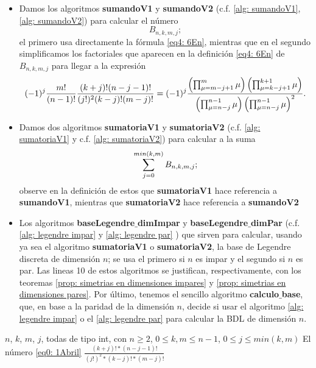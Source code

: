\begin{itemize}
\item Damos los algoritmos \textbf{sumandoV1} y 
\textbf{sumandoV2} (c.f. \ref{alg: sumandoV1},
\ref{alg: sumandoV2}) para calcular el número
\begin{equation}
\label{eq0: 1Abril}
B_{n, k, m, j};
\end{equation}
el primero usa directamente la fórmula \eqref{eq4: 6En},
mientras que en el segundo 
simplificamos los factoriales que
aparecen en la definición \eqref{eq4: 6En}
de $B_{n,k,m,j}$
para llegar a la expresión
\[
(-1)^{j}
\frac{m!}{(n-1)!}
 \frac{(k+j)!(n-j-1)!}{(j!)^{2}(k-j)!(m-j)!}
= (-1)^{j}
\frac{\left( \prod_{\mu=m-j+1}^{m}{\mu} \right)
\left( \prod_{\mu=k-j+1}^{k+1}{\mu} \right)
}{
\left( \prod_{\mu=n-j}^{n-1}{\mu} \right)
\left( \prod_{\mu=n-j}^{n-1}{\mu} \right)^{2}
}.
\]

\item Damos dos algoritmos \textbf{sumatoriaV1}
y \textbf{sumatoriaV2} (c.f. \ref{alg: sumatoriaV1}
y c.f. \ref{alg: sumatoriaV2}) para calcular a la suma
\begin{equation}
\label{eq1: 1Abril}
\sum\limits_{j=0}^{min(k,m)}B_{n, k, m, j};
\end{equation}
observe en la definición de estos que 
\textbf{sumatoriaV1} hace referencia a
\textbf{sumandoV1}, mientras que \textbf{sumatoriaV2}
hace referencia a \textbf{sumandoV2}


\item Los algoritmos 
\textbf{baseLegendre$\_$dimImpar} y
\textbf{baseLegendre$\_$dimPar} 
(c.f. \ref{alg: legendre impar} y \ref{alg: legendre par} )
que sirven para calcular, usando ya sea el algoritmo
\textbf{sumatoriaV1} o \textbf{sumatoriaV2},
la base de Legendre discreta de dimensión $n$; se usa el primero
si $n$ es impar y el segundo si $n$ es par.
Las lineas 10 de estos 
algoritmos se justifican,
respectivamente, con los teoremas 
\ref{prop: simetrias en dimensiones impares}
y \ref{prop: simetrias en dimensiones pares}.
Por último, tenemos el sencillo algoritmo \textbf{calculo$\_$base},
que, en base a la paridad de la dimensión $n$, decide si usar
el algoritmo \ref{alg: legendre impar} o el \ref{alg: legendre par}
para calcular la BDL de dimensión $n$.
\end{itemize}


\begin{algorithm}
\caption{$sumandoV1$}\label{alg: sumandoV1}
\begin{algorithmic} [1]
\REQUIRE $n$, $k$, $m$, $j$, todas de tipo int, con $n \geq 2$, 
$0 \leq k, m \leq n-1$, $0 \leq j \leq min(k,m)$
\ENSURE El número \eqref{eq0: 1Abril}
\RETURN $\frac{(k+j)! * (n-j-1)! }{(j!)^{2}* (k-j)! * (m-j)!}$
\end{algorithmic}
\end{algorithm}

